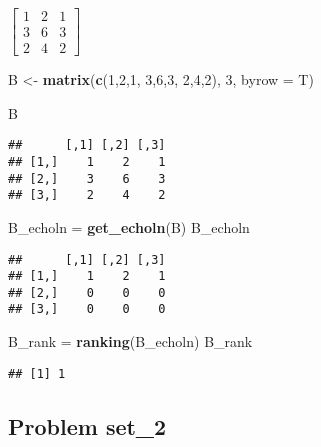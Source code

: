 \documentclass[]{article}
\newenvironment{Shaded}{\begin{snugshade}}{\end{snugshade}}
\newcommand{\DataTypeTok}[1]{\textcolor[rgb]{0.13,0.29,0.53}{#1}}
\newcommand{\DecValTok}[1]{\textcolor[rgb]{0.00,0.00,0.81}{#1}}
\newcommand{\KeywordTok}[1]{\textcolor[rgb]{0.13,0.29,0.53}{\textbf{#1}}}
\newcommand{\NormalTok}[1]{#1}
\newcommand{\StringTok}[1]{\textcolor[rgb]{0.31,0.60,0.02}{#1}}
\begin{document}
\(\begin{bmatrix} 1 & 2 & 1 \\ 3 & 6 & 3 \\ 2 & 4 & 2 \end{bmatrix}\)

\begin{Shaded}
\begin{Highlighting}[]
\NormalTok{B <-}\StringTok{ }\KeywordTok{matrix}\NormalTok{(}\KeywordTok{c}\NormalTok{(}\DecValTok{1}\NormalTok{,}\DecValTok{2}\NormalTok{,}\DecValTok{1}\NormalTok{,}
              \DecValTok{3}\NormalTok{,}\DecValTok{6}\NormalTok{,}\DecValTok{3}\NormalTok{,}
              \DecValTok{2}\NormalTok{,}\DecValTok{4}\NormalTok{,}\DecValTok{2}\NormalTok{), }\DecValTok{3}\NormalTok{, }\DataTypeTok{byrow =}\NormalTok{ T)}

\NormalTok{B}
\end{Highlighting}
\end{Shaded}

\begin{verbatim}
##      [,1] [,2] [,3]
## [1,]    1    2    1
## [2,]    3    6    3
## [3,]    2    4    2
\end{verbatim}

\begin{Shaded}
\begin{Highlighting}[]
\NormalTok{B_echoln =}\StringTok{ }\KeywordTok{get_echoln}\NormalTok{(B)}
\NormalTok{B_echoln}
\end{Highlighting}
\end{Shaded}

\begin{verbatim}
##      [,1] [,2] [,3]
## [1,]    1    2    1
## [2,]    0    0    0
## [3,]    0    0    0
\end{verbatim}

\begin{Shaded}
\begin{Highlighting}[]
\NormalTok{B_rank =}\StringTok{ }\KeywordTok{ranking}\NormalTok{(B_echoln)}
\NormalTok{B_rank}
\end{Highlighting}
\end{Shaded}

\begin{verbatim}
## [1] 1
\end{verbatim}

\hypertarget{problem-set_2}{%
\subsection{Problem set\_2}\label{problem-set_2}}
\end{document}
